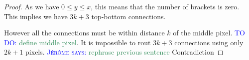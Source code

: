 \documentclass{paper}
\newcommand{\mremark}[3]{\textcolor{blue}{\textsc{#1 #2:}} \textcolor{SeaGreen}{\textsf{#3}}}
\newcommand{\jerome}[2][says]{\mremark{J\'er\^ome}{#1}{#2}}
\newcommand{\todo}[2][DO]{\mremark{TO}{#1}{#2}}
\begin{document}
{\begin{proof}
As we have $0\leq y\leq x$, this means that the number of brackets is zero. This implies we have $3k+3$ top-bottom connections.

However all the connections must be within distance $k$ of the middle pixel. \todo{define middle pixel}. It is impossible to rout $3k+3$ connections using only $2k+1$ pixels. \jerome{rephrase previous sentence}
Contradiction







\end{proof}














}
\end{document}
